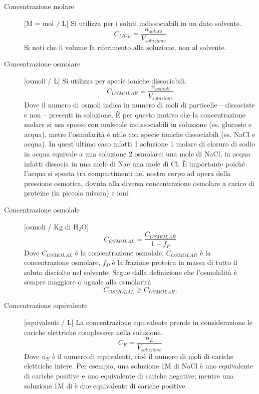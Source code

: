\begin{description}
    \item[Concentrazione molare] [M = mol / L] Si utilizza per i soluti indissociabili in un dato solvente.
    \begin{equation*}
    C_{MOL} = \frac{n_{soluto}}{V_{soluzione}}
    \end{equation*}
    Si noti che il volume fa riferimento alla soluzione, non al solvente.
    
    \item[Concentrazione osmolare] [osmoli / L]
    Si utilizza per specie ioniche dissociabili.
    \begin{equation*}
    C_{OSMOLAR} = \frac{n_{osmoli}}{V_{soluzione}}
    \end{equation*}
    Dove il numero di osmoli indica in numero di moli di particelle -- dissociate e non -- presenti in soluzione. È per questo motivo che la concentrazione molare si usa spesso con molecole indissociabili in soluzione (es. glucosio e acqua), metre l'osmolarità è utile con specie ioniche dissociabili (es. NaCl e acqua). In quest'ultimo caso infatti 1 soluzione 1 molare di cloruro di sodio in acqua equivale a una soluzione 2 osmolare: una mole di NaCl, in acqua infatti dissocia in una mole di Na\p e una mole di Cl\m. È importante poiché l'acqua si sposta tra compartimenti nel nostro corpo ad opera della pressione osmotica, dovuta alla diversa concentrazione osmolare a carico di proteine (in piccola misura) e ioni.
    
    
    \item[Concentrazione osmolale] [osmoli / Kg di H$_2$O]
    \begin{equation*}
        C_{OSMOLAL} = \frac{C_{OSMOLAR}}{1-f_P}
    \end{equation*}
    Dove $C_{OSMOLAL}$ è la concentrazione osmolale, $C_{OSMOLAR}$ è la concentrazione osmolare, $f_P$ è la frazione proteica in massa di tutto il soluto disciolto nel solvente. Segue dalla definizione che l'osmolalità è sempre maggiore o uguale alla osmolarità
    \begin{equation*}
        C_{OSMOLAL} \geq C_{OSMOLAR}.
    \end{equation*}
    
    \item[Concentrazione equivalente] [equivalenti / L]
    La concentrazione equivalente prende in considerazione le cariche elettriche complessive nella soluzione.
    \begin{equation*}
        C_E = \frac{n_E}{V_{soluzione}}
    \end{equation*}
    Dove $n_E$ è il numero di equivalenti, cioè il numero di moli di cariche elettriche intere. Per esempio, una soluzione 1M di NaCl è uno equivalente di cariche positive e uno equivalente di cariche negative; mentre una soluzione 1M di  è due equivalente di cariche positive.
    

\end{description}
